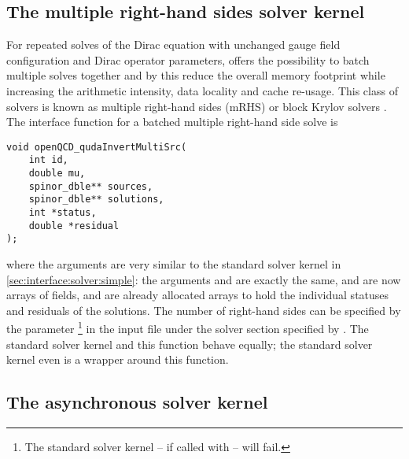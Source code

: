 
\subsection{The multiple right-hand sides solver kernel}
\label{sec:interface:solver:mrhs}

For repeated solves of the Dirac equation with unchanged gauge field configuration and Dirac operator parameters, \quda offers the possibility to batch multiple solves together and by this reduce the overall memory footprint while increasing the arithmetic intensity, data locality and cache re-usage.
This class of solvers is known as multiple right-hand sides (mRHS) or block Krylov solvers \cite{Sakurai:2009rb,Nakamura:2011my,Birk:2011jly,Clark:2017ekr,Boyle:2024pio,Richtmann:2016kcq,Boyle:2014rwa}.
The interface function for a batched multiple right-hand side solve is
\begin{verbatim}
void openQCD_qudaInvertMultiSrc(
    int id,
    double mu,
    spinor_dble** sources,
    spinor_dble** solutions,
    int *status,
    double *residual
);
\end{verbatim}
where the arguments are very similar to the standard solver kernel in \cref{sec:interface:solver:simple}:
the arguments  and  are exactly the same,  and  are now arrays of  fields,  and  are already allocated arrays to hold the individual statuses and residuals of the solutions.
The number of right-hand sides can be specified by the parameter \footnote{The standard solver kernel -- if called with  -- will fail.} in the input file under the solver section specified by .
The standard solver kernel and this function behave equally; the standard solver kernel even is a wrapper around this function.

\subsection{The asynchronous solver kernel}
\label{sec:interface:solver:async}

